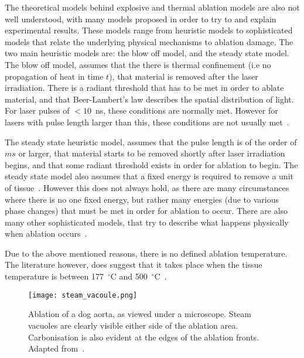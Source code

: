 The theoretical models behind explosive and thermal ablation models are also not well understood, with many models proposed in order to try to and explain experimental results. These models range from heuristic models to sophisticated models that relate the underlying physical mechanisms to ablation damage. 
The two main heuristic models are: the blow off model, and the steady state model. 
The blow off model, assumes that the there is thermal confinement (i.e no propagation of heat in time $t$), that material is removed after the laser irradiation. There is a radiant threshold that has to be met in order to ablate material, and that Beer-Lambert's law describes the spatial distribution of light. For laser pulses of $<10$~ns, these conditions are normally met. However for lasers with pulse length larger than this, these conditions are not usually met~\cite{vogel2003mechanisms,koren1984emission,andrew1983direct}. 

The steady state heuristic model, assumes that the pulse length is of the order of $ms$ or larger, that material starts to be removed shortly after laser irradiation begins, and that some radiant threshold exists in order for ablation to begin. The steady state model also assumes that a fixed energy is required to remove a unit of tissue~\cite{vogel2003mechanisms}. However this does not always hold, as there are many circumstances where there is no one fixed energy, but rather many energies (due to various phase changes) that must be met in order for ablation to occur. There are also many other sophisticated models, that try to describe what happens physically when ablation occurs~\cite{mckenzie1990physics,mckenzie1986three,majaron1999thermo}.

Due to the above mentioned reasons, there is no defined ablation temperature. The literature however, does suggest that it takes place when the tissue temperature is between 177~${^{\circ}}$C and 500~${^{\circ}}$C~\cite{gerstmann1994char,mckenzie1986three,sagi1992heating}. 

\begin{figure}	
\vspace{-10pt}
	\centering
	\texttt{[image: steam\_vacoule.png]}
	\caption{Ablation of a dog aorta, as viewed under a microscope. Steam vacuoles are clearly visible either side of the ablation area. Carbonisation is also evident at the edges of the ablation fronts. Adapted from~\cite{welch2011optical}.}
	\label{fig:histology}
	\vspace{-10pt}
\end{figure}

